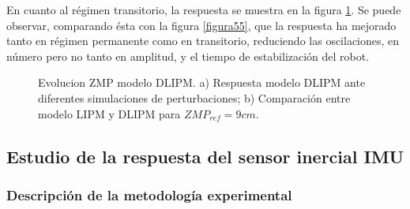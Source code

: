En cuanto al régimen transitorio, la respuesta se muestra en la figura \ref{figura514}. Se puede observar, comparando ésta con la figura \ref{figura55}, que la respuesta ha mejorado tanto en régimen permanente como en transitorio, reduciendo las oscilaciones, en número pero no tanto en amplitud, y el tiempo de estabilización del robot.

\begin{figure}[H]
\centering
{}
\quad
{}
\caption{Evolucion ZMP modelo DLIPM. a) Respuesta modelo DLIPM ante diferentes simulaciones de perturbaciones; b) Comparación entre modelo LIPM y DLIPM para $ZMP_{ref} = 9 cm$.}
\label{figura514}
\end{figure}

\subsection{Estudio de la respuesta del sensor inercial IMU}\label{respuestaIMU}

\subsubsection{Descripción de la metodología experimental}

